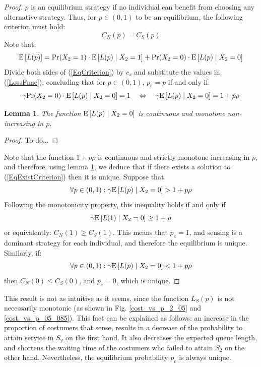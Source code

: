 \documentclass[11pt]{article}
\numberwithin{equation}{section}
\newtheorem{lemma}{Lemma}[proposition]
\newcommand{\pr}{{\rm Pr}}
\newcommand{\e}{{\rm E}}
\begin{document}
\begin{proof}

$p$ is an equilibrium strategy if no individual can benefit from choosing any alternative strategy. Thus, for $p \in (0,1)$ to be an equilibrium, the following criterion must hold: 
\begin{equation}
C_{N}(p)=C_{S}(p) \label{EqCriterion}
\end{equation}
Note that:
\[ \e\left[L(p)\right] = \pr(X_2=1) \cdot \e\left[L(p)\mid X_2=1\right] + \pr(X_2=0) \cdot \e\left[L(p)\mid X_2=0\right] \]
Divide both sides of (\ref{EqCriterion}) by $c_{s}$ and substitute the values in (\ref{LossFunc}), concluding that for $p \in (0,1)$, $p_{e} = p$ if and only if:
\begin{equation}
\gamma \pr(X_2=0) \cdot \e\left[L(p)\mid X_2=0\right] = 1 \quad\Leftrightarrow\quad \gamma \e\left[L(p)\mid X_2=0\right]=1+p\rho \label{EqExistCriterion}
\end{equation}

\begin{lemma}
The function $\e\left[L(p)\mid X_2=0\right]$ is continuous and monotone non-increasing in $p$. \label{MonotonicityLemma}
\end{lemma}

\begin{proof}
To-do...
\end{proof}

Note that the function $1+p\rho$ is continuous and strictly monotone increasing in $p$, and therefore, using lemma \ref{MonotonicityLemma}, we deduce that if there exists a solution to (\ref{EqExistCriterion}) then it is unique. 
Suppose that
\[ \forall p \in (0,1): \gamma \e\left[L(p)\mid X_2=0\right] > 1+p\rho \] 
Following the monotonicity property, this inequality holds if and only if \[ \gamma \e\left[L(1)\mid X_2=0\right] \geq 1+\rho \] or equivalently: $C_{N}(1) \geq C_{S}(1)$. This means that $p_{e}=1$, and sensing is a dominant strategy for each individual, and therefore the equilibrium is unique. Similarly, if: 
\[ \forall p \in (0,1): \gamma \e\left[L(p)\mid X_2=0\right] < 1+p\rho \] 
then $C_{N}(0) \leq C_{S}(0)$, and $p_{e}=0$, which is unique.
\end{proof}

This result is not as intuitive as it seems, since the function $L_{S}(p)$ is not necessarily monotonic (as shown in Fig. \ref{cost_vs_p_2_05} and \ref{cost_vs_p_05_085}). This fact can be explained as follows: an increase in the proportion of costumers that sense, results in a decrease of the probability to attain service in $S_{2}$ on the first hand. It also decreases the expected queue length, and shortens the waiting time of the costumers who failed to attain $S_{2}$ on the other hand. Nevertheless, the equilibrium probability $p_{e}$ is always unique.
\end{document}
